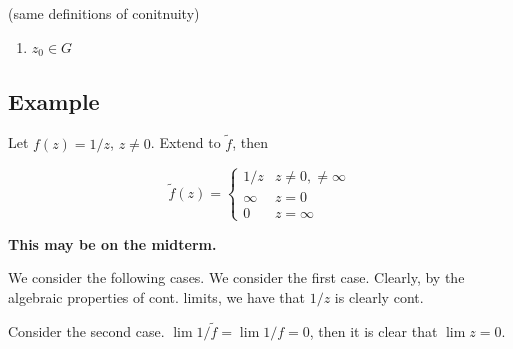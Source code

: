 \documentclass{article}
\newtheorem{one minute paper}[theorem]{One Minute Paper}
\begin{document}
(same definitions of conitnuity)
\begin{enumerate}
    \item $z_0 \in G$
\end{enumerate}

\subsection*{Example}

Let $f(z) = 1/z$, $z \neq 0$. Extend to $\tilde{f}$, then 

\begin{equation}
    \tilde{f}(z) = \begin{cases}
        1/z & z \neq 0, \neq \infty\\
        \infty & z = 0\\
        0 & z = \infty
    \end{cases}
\end{equation}

\textbf{This may be on the midterm.}

We consider the following cases. We consider the first case. Clearly, by the algebraic properties of cont. limits, we have that $1/z$ is clearly cont. 

Consider the second case. $\lim 1/\tilde{f} = \lim 1/f =0$, then it is clear that $\lim z = 0$. 
\end{document}
